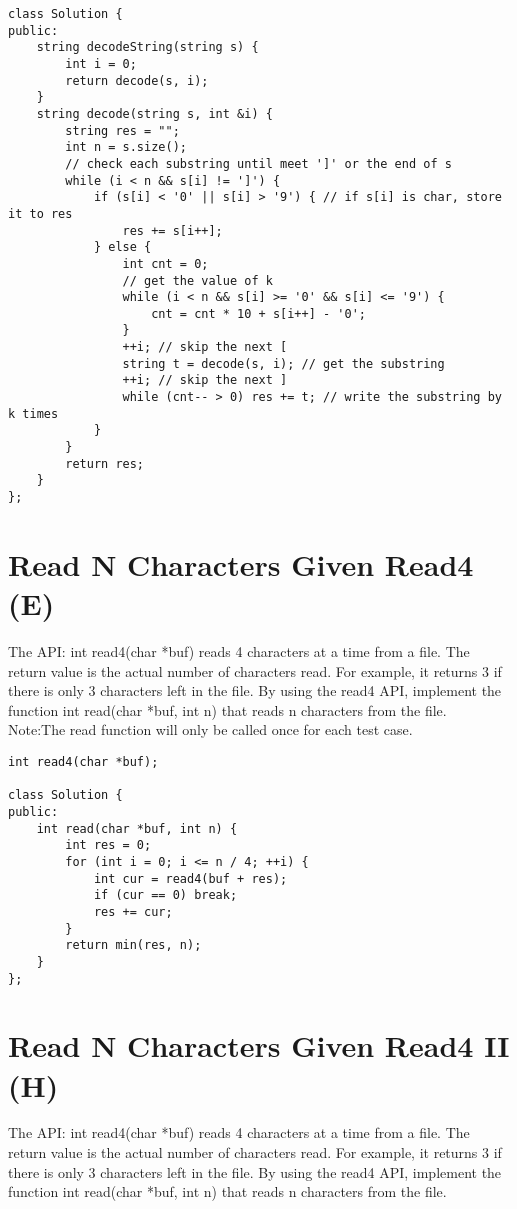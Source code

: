 \begin{lstlisting}
class Solution {
public:
    string decodeString(string s) {
        int i = 0;
        return decode(s, i);
    }
    string decode(string s, int &i) {
        string res = "";
        int n = s.size();
        // check each substring until meet ']' or the end of s
        while (i < n && s[i] != ']') { 
            if (s[i] < '0' || s[i] > '9') { // if s[i] is char, store it to res
                res += s[i++];
            } else {
                int cnt = 0;
                // get the value of k
                while (i < n && s[i] >= '0' && s[i] <= '9') {
                    cnt = cnt * 10 + s[i++] - '0';
                }
                ++i; // skip the next [
                string t = decode(s, i); // get the substring
                ++i; // skip the next ]
                while (cnt-- > 0) res += t; // write the substring by k times
            }
        }
        return res;
    }
};
\end{lstlisting}


\section{Read N Characters Given Read4 (E)}
The API: int read4(char *buf) reads 4 characters at a time from a file. The return value is the actual number of characters read. For example, it returns 3 if there is only 3 characters left in the file. By using the read4 API, implement the function int read(char *buf, int n) that reads n characters from the file.\\

Note:The read function will only be called once for each test case.\\

\begin{lstlisting}
int read4(char *buf);

class Solution {
public:
    int read(char *buf, int n) {
        int res = 0;
        for (int i = 0; i <= n / 4; ++i) {
            int cur = read4(buf + res);
            if (cur == 0) break;
            res += cur;
        }
        return min(res, n);
    }
};
\end{lstlisting}


\section{Read N Characters Given Read4 II (H)}
The API: int read4(char *buf) reads 4 characters at a time from a file. The return value is the actual number of characters read. For example, it returns 3 if there is only 3 characters left in the file. By using the read4 API, implement the function int read(char *buf, int n) that reads n characters from the file.\\

